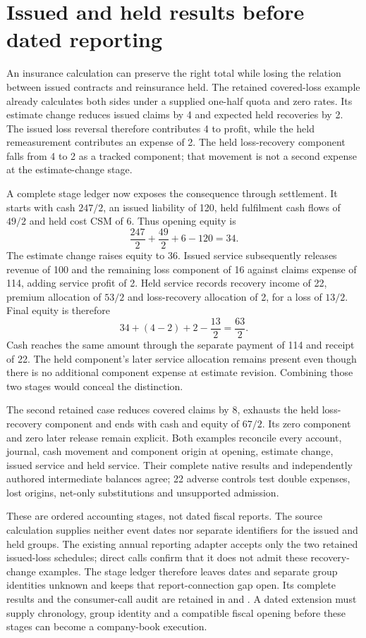 \clearpage
\section{Issued and held results before dated reporting}
\label{sim:insurance-recovery-stages}

An insurance calculation can preserve the right total while losing the relation
between issued contracts and reinsurance held. The retained covered-loss example
already calculates both sides under a supplied one-half quota and zero rates.
Its estimate change reduces issued claims by 4 and expected held recoveries by
2. The issued loss reversal therefore contributes 4 to profit, while the held
remeasurement contributes an expense of 2. The held loss-recovery component
falls from 4 to 2 as a tracked component; that movement is not a second expense
at the estimate-change stage.

A complete stage ledger now exposes the consequence through settlement. It
starts with cash $247/2$, an issued liability of 120, held fulfilment cash flows
of $49/2$ and held cost CSM of 6. Thus opening equity is
\[
 \frac{247}{2}+\frac{49}{2}+6-120=34.
\]
The estimate change raises equity to 36. Issued service subsequently releases
revenue of 100 and the remaining loss component of 16 against claims expense
of 114, adding service profit of 2. Held service records recovery income of 22,
premium allocation of $53/2$ and loss-recovery allocation of 2, for a loss of
$13/2$. Final equity is therefore
\[
 34+(4-2)+2-\frac{13}{2}=\frac{63}{2}.
\]
Cash reaches the same amount through the separate payment of 114 and receipt
of 22. The held component's later service allocation remains present even
though there is no additional component expense at estimate revision. Combining
those two stages would conceal the distinction.

The second retained case reduces covered claims by 8, exhausts the held
loss-recovery component and ends with cash and equity of $67/2$. Its zero
component and zero later release remain explicit. Both examples reconcile
every account, journal, cash movement and component origin at opening, estimate
change, issued service and held service. Their complete native results and
independently authored intermediate balances agree; 22 adverse controls test
double expenses, lost origins, net-only substitutions and unsupported admission.

These are ordered accounting stages, not dated fiscal reports. The source
calculation supplies neither event dates nor separate identifiers for the issued
and held groups. The existing annual reporting adapter accepts only the two
retained issued-loss schedules; direct calls confirm that it does not admit
these recovery-change examples. The stage ledger therefore leaves dates and
separate group identities unknown and keeps that report-connection gap open.
Its complete results and the consumer-call audit are retained in
and .
A dated extension must supply chronology, group identity and a compatible fiscal
opening before these stages can become a company-book execution.
